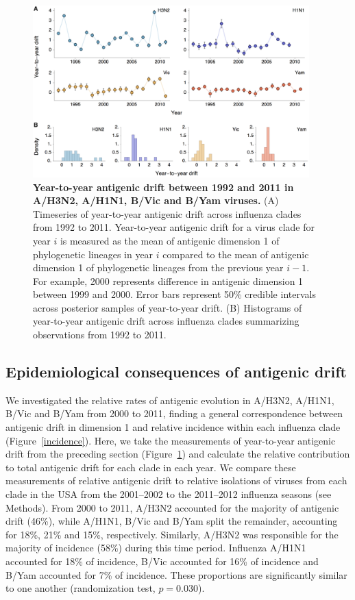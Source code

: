 \documentclass[11pt,oneside,letterpaper]{article}
\begin{document}
\begin{figure}[h]
	\centering		
	\includegraphics[width=0.95\textwidth]{figures/jumps}
	\caption{\textbf{Year-to-year antigenic drift between 1992 and 2011 in A/H3N2, A/H1N1, B/Vic and B/Yam viruses.} 
	(A) Timeseries of year-to-year antigenic drift across influenza clades from 1992 to 2011.
	Year-to-year antigenic drift for a virus clade for year $i$ is measured as the mean of antigenic dimension 1 of phylogenetic lineages in year $i$ compared to the mean of antigenic dimension 1 of phylogenetic lineages from the previous year $i-1$.
	For example, 2000 represents difference in antigenic dimension 1 between 1999 and 2000.
	Error bars represent 50\% credible intervals across posterior samples of year-to-year drift.
	(B) Histograms of year-to-year antigenic drift across influenza clades summarizing observations from 1992 to 2011.
	} 
	\label{jumps} 
\end{figure}

\subsection*{Epidemiological consequences of antigenic drift}

We investigated the relative rates of antigenic evolution in A/H3N2, A/H1N1, B/Vic and B/Yam from 2000 to 2011, finding a general correspondence between antigenic drift in dimension 1 and relative incidence within each influenza clade (Figure~\ref{incidence}).
Here, we take the measurements of year-to-year antigenic drift from the preceding section (Figure~\ref{jumps}) and calculate the relative contribution to total antigenic drift for each clade in each year.
We compare these measurements of relative antigenic drift to relative isolations of viruses from each clade in the USA from the 2001--2002 to the 2011--2012 influenza seasons (see Methods).
From 2000 to 2011, A/H3N2 accounted for the majority of antigenic drift (46\%), while A/H1N1, B/Vic and B/Yam split the remainder, accounting for 18\%, 21\% and 15\%, respectively.
Similarly, A/H3N2 was responsible for the majority of incidence (58\%) during this time period.
Influenza A/H1N1 accounted for 18\% of incidence, B/Vic accounted for 16\% of incidence and B/Yam accounted for 7\% of incidence.
These proportions are significantly similar to one another (randomization test, $p = 0.030$).
\end{document}
